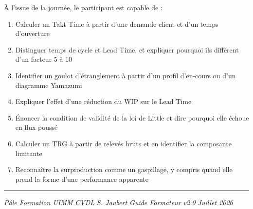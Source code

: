 \documentclass[
]{article}
\providecommand{\tightlist}{%
  \setlength{\itemsep}{0pt}\setlength{\parskip}{0pt}}
\begin{document}
À l'issue de la journée, le participant est capable de :

\begin{enumerate}
\def\labelenumi{\arabic{enumi}.}
\tightlist
\item
  Calculer un Takt Time à partir d'une demande client et d'un temps
  d'ouverture
\item
  Distinguer temps de cycle et Lead Time, et expliquer pourquoi ils
  diffèrent d'un facteur 5 à 10
\item
  Identifier un goulot d'étranglement à partir d'un profil d'en-cours ou
  d'un diagramme Yamazumi
\item
  Expliquer l'effet d'une réduction du WIP sur le Lead Time
\item
  Énoncer la condition de validité de la loi de Little et dire pourquoi
  elle échoue en flux poussé
\item
  Calculer un TRG à partir de relevés bruts et en identifier la
  composante limitante
\item
  Reconnaître la surproduction comme un gaspillage, y compris quand elle
  prend la forme d'une performance apparente
\end{enumerate}

\begin{center}\rule{0.5\linewidth}{0.5pt}\end{center}

\emph{Pôle Formation UIMM CVDL \textbar{} S. Jaubert \textbar{} Guide
Formateur v2.0 \textbar{} Juillet 2026}
\end{document}
